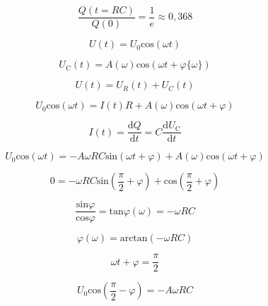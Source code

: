     \begin{equation}
        \frac{Q(t = RC)}{Q(0)} = \frac{1}{e} \approx 0,368
    \end{equation}

    \begin{equation}
        U(t) = U_0 \text{cos}( \omega t)
    \end{equation}

    \begin{equation}
        U_{\text{C}}(t) = A(\omega) \text{cos}(\omega t + \varphi \{ \omega \} )
    \end{equation}

    \begin{equation}
        U(t) = U_R(t) + U_C(t)
    \end{equation}

    \begin{equation}
        U_0 \text{cos}(\omega t) = I(t)R + A(\omega) \text{cos}(\omega t + \varphi)
    \end{equation}

    \begin{equation}
        I(t) = \frac{\text{d}Q}{\text{d}t} = C \frac{\text{d}U_\text{C}}{\text{d}t}
    \end{equation}

    \begin{equation}
        U_0 \text{cos}(\omega t) = -A\omega R C \text{sin}(\omega t + \varphi) + A(\omega) \text{cos}(\omega t + \varphi)
    \end{equation}

    \begin{equation}
        0 = -\omega R C \text{sin} \left( \frac{\pi}{2} + \varphi \right) + \text{cos} \left( \frac{\pi}{2} + \varphi \right)
    \end{equation}

    \begin{equation}
        \frac{\text{sin} \varphi}{\text{cos} \varphi} = \text{tan} \varphi (\omega) = -\omega RC 
    \end{equation}

    \begin{equation}
        \varphi (\omega) = \text{arctan} ( - \omega R C)
    \end{equation}

    \begin{equation}
        \omega t + \varphi = \frac{\pi}{2}
    \end{equation}

    \begin{equation}
        U_0 \text{cos}(\frac{\pi}{2} - \varphi) = -A \omega R C 
    \end{equation}

